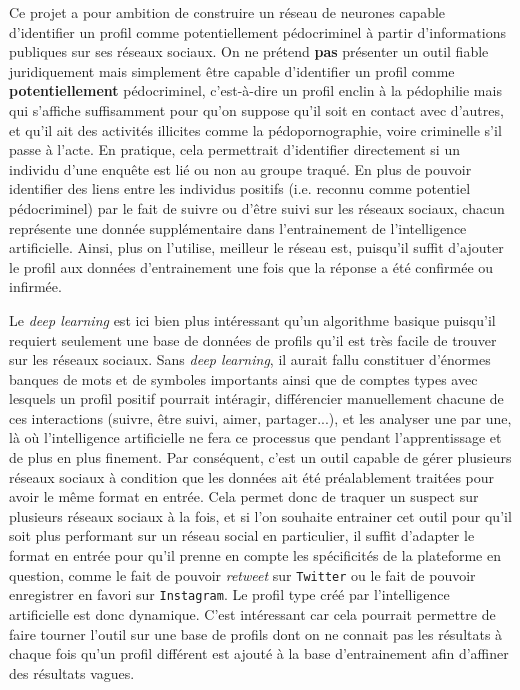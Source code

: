 \documentclass[a4paper, 11pt]{article}
\begin{document}
        Ce projet a pour ambition de construire un réseau de neurones capable d'identifier un profil comme potentiellement pédocriminel à partir d'informations publiques sur ses réseaux sociaux. On ne prétend \textbf{pas} présenter un outil fiable juridiquement mais simplement être capable d'identifier un profil comme \textbf{potentiellement} pédocriminel, c'est-à-dire un profil enclin à la pédophilie mais qui s'affiche suffisamment pour qu'on suppose qu'il soit en contact avec d'autres, et qu'il ait des activités illicites comme la pédopornographie, voire criminelle s'il passe à l'acte. En pratique, cela permettrait d'identifier directement si un individu d'une enquête est lié ou non au groupe traqué. En plus de pouvoir identifier des liens entre les individus positifs (i.e. reconnu comme potentiel pédocriminel) par le fait de suivre ou d'être suivi sur les réseaux sociaux, chacun représente une donnée supplémentaire dans l'entrainement de l'intelligence artificielle. Ainsi, plus on l'utilise, meilleur le réseau est, puisqu'il suffit d'ajouter le profil aux données d'entrainement une fois que la réponse a été confirmée ou infirmée.

        Le \emph{deep learning} est ici bien plus intéressant qu'un algorithme basique puisqu'il requiert seulement une base de données de profils qu'il est très facile de trouver sur les réseaux sociaux. Sans \emph{deep learning}, il aurait fallu constituer d'énormes banques de mots et de symboles importants ainsi que de comptes types avec lesquels un profil positif pourrait intéragir, différencier manuellement chacune de ces interactions (suivre, être suivi, aimer, partager...), et les analyser une par une, là où l'intelligence artificielle ne fera ce processus que pendant l'apprentissage et de plus en plus finement. Par conséquent, c'est un outil capable de gérer plusieurs réseaux sociaux à condition que les données ait été préalablement traitées pour avoir le même format en entrée. Cela permet donc de traquer un suspect sur plusieurs réseaux sociaux à la fois, et si l'on souhaite entrainer cet outil pour qu'il soit plus performant sur un réseau social en particulier, il suffit d'adapter le format en entrée pour qu'il prenne en compte les spécificités de la plateforme en question, comme le fait de pouvoir \emph{retweet} sur \texttt{Twitter} ou le fait de pouvoir enregistrer en favori sur \texttt{Instagram}. Le profil type créé par l'intelligence artificielle est donc dynamique. C'est intéressant car cela pourrait permettre de faire tourner l'outil sur une base de profils dont on ne connait pas les résultats à chaque fois qu'un profil différent est ajouté à la base d'entrainement afin d'affiner des résultats vagues.
\end{document}
